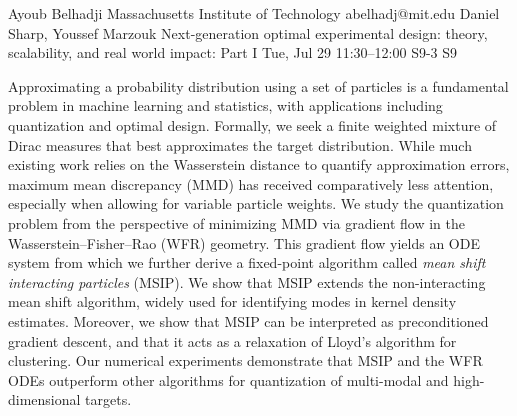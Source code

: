 \documentclass[12pt,lettersize,oneside]{book} %
\begin{document}
\begin{talk}
  {Ayoub Belhadji}%
  {Massachusetts Institute of Technology}%
  {abelhadj@mit.edu}%
  {Daniel Sharp, Youssef Marzouk}%
  {Next-generation optimal experimental design: theory, scalability, and real world impact: Part I}%
  {}%
  {Tue, Jul 29 11:30--12:00}%
  {S9-3}%
  {S9}%
    
   
Approximating a probability distribution using a set of particles is a fundamental problem in machine learning and statistics, with applications including  quantization and optimal design. Formally, we seek a finite weighted mixture of Dirac measures that best approximates the target distribution. While much existing work relies on the Wasserstein distance to quantify approximation errors, maximum mean discrepancy (MMD) has received comparatively less attention, especially when allowing for variable particle weights. We study the quantization problem from the perspective of minimizing MMD via gradient flow in the Wasserstein--Fisher--Rao (WFR) geometry. This gradient flow yields an ODE system from which we further derive a fixed-point algorithm called \emph{mean shift interacting particles} (MSIP). We show that MSIP extends the non-interacting mean shift algorithm, widely used for identifying modes in kernel density estimates. Moreover, we show that MSIP can be interpreted as preconditioned gradient descent, and that it acts as a relaxation of Lloyd's algorithm for clustering. 
Our numerical experiments demonstrate that MSIP and the WFR ODEs outperform other algorithms for quantization of multi-modal and high-dimensional targets.
\medskip


\end{talk}
\end{document}
